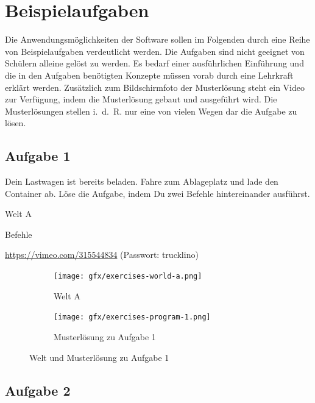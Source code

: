 \chapter{Beispielaufgaben}
\label{sec:exercises}

Die Anwendungsmöglichkeiten der Software sollen im Folgenden durch eine Reihe von Beispielaufgaben verdeutlicht werden. Die Aufgaben sind nicht geeignet von Schülern alleine gelöst zu werden. Es bedarf einer ausführlichen Einführung und die in den Aufgaben benötigten Konzepte müssen vorab durch eine Lehrkraft erklärt werden. Zusätzlich zum Bildschirmfoto der Musterlösung steht ein Video zur Verfügung, indem die Musterlösung gebaut und ausgeführt wird. Die Musterlösungen stellen i.~d.~R. nur eine von vielen Wegen dar die Aufgabe zu lösen.

\section{Aufgabe 1}
\label{sec:exercises:1}

Dein Lastwagen ist bereits beladen. Fahre zum Ablageplatz und lade den Container ab. Löse die Aufgabe, indem Du zwei Befehle hintereinander ausführst.

\begin{description}[noitemsep]
  \item[Welt wählen:] Welt A
  \item[Du brauchst:] Befehle
  \item[Video:] \url{https://vimeo.com/315544834} (Passwort: trucklino)
\end{description}

\begin{figure}[H]
  \begin{subfigure}[b]{0.40\textwidth}
    \texttt{[image: gfx/exercises-world-a.png]}
    \caption{Welt A}
  \end{subfigure}\hfill
  \begin{subfigure}[b]{0.40\textwidth}
    \texttt{[image: gfx/exercises-program-1.png]}
    \caption{Musterlösung zu Aufgabe 1}
  \end{subfigure}\hfill
  \caption{Welt und Musterlösung zu Aufgabe 1}
\end{figure}

\pagebreak

\section{Aufgabe 2}
\label{sec:exercises:2}

